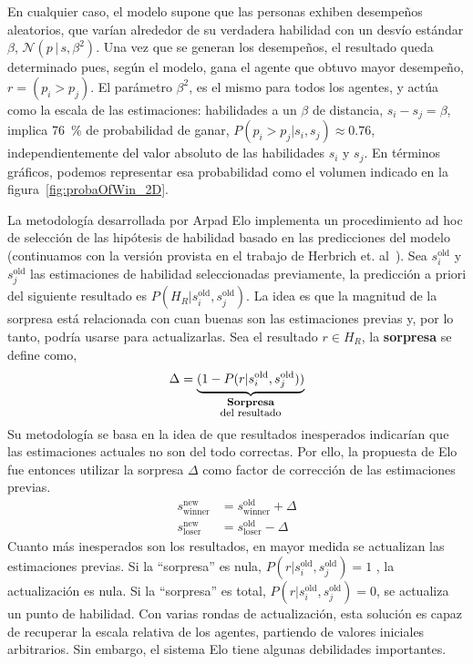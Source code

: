 \documentclass[a4paper,11pt]{book}
\newcommand{\N}{\mathcal{N}}
\newcommand\hfrac[2]{\genfrac{}{}{0pt}{}{#1}{#2}} %
\theoremstyle{definition}
\begin{document}
%
En cualquier caso, el modelo supone que las personas exhiben desempe\~nos aleatorios, que var\'ian alrededor de su verdadera habilidad con un desv\'io est\'andar $\beta$, $\N(p\,|\,s,\beta^2)$.
%
Una vez que se generan los desempe\~nos, el resultado queda determinado pues, seg\'un el modelo, gana el agente que obtuvo mayor desempe\~no, $r = (p_i > p_j)$.
%
El par\'ametro $\beta^2$, es el mismo para todos los agentes, y act\'ua como la escala de las estimaciones: habilidades a un $\beta$ de distancia, $s_i-s_j=\beta$, implica \SI{76}{\percent} de probabilidad de ganar, $P(p_i > p_j|s_i,s_j)\approx0.76$, independientemente del valor absoluto de las habilidades $s_i$ y $s_j$.
%
En t\'erminos gr\'aficos, podemos representar esa probabilidad como el volumen indicado en la figura~\ref{fig:probaOfWin_2D}.

La metodolog\'ia desarrollada por Arpad Elo implementa un procedimiento ad hoc de selecci\'on de las hip\'otesis de habilidad basado en las predicciones del modelo (continuamos con la versi\'on provista en el trabajo de Herbrich et. al~\cite{Herbrich2007}).
%
Sea $s_i^{\text{old}}$ y $s_j^{\text{old}}$ las estimaciones de habilidad seleccionadas previamente, la predicci\'on a priori del siguiente resultado es $P(H_R|s_i^{\text{old}},s_j^{\text{old}})$.
%
La idea es que la magnitud de la sorpresa est\'a relacionada con cuan buenas son las estimaciones previas y, por lo tanto, podr\'ia usarse para actualizarlas.
%
Sea el resultado $r \in H_R$, la \textbf{sorpresa} se define como,
%
\begin{equation*}
 \Delta = \underbrace{(1 - P(r|s_i^{\text{old}},s_j^{\text{old}}))}_{\hfrac{\textbf{\footnotesize Sorpresa}}{\text{\footnotesize del resultado}}}
\end{equation*}
%
Su metodolog\'ia se basa en la idea de que resultados inesperados indicar\'ian que las estimaciones actuales no son del todo correctas.
%
Por ello, la propuesta de Elo fue entonces utilizar la sorpresa $\Delta$ como factor de correcci\'on de las estimaciones previas.
%
\begin{equation}\label{eq:elo_update}
\begin{split}
s_{\text{winner}}^{\text{new}} &= s_{\text{winner}}^{\text{old}} + \Delta \\
s_{\text{loser}}^{\text{new}} &= s_{\text{loser}}^{\text{old}} - \Delta
\end{split}
\end{equation}
%
Cuanto m\'as inesperados son los resultados, en mayor medida se actualizan las estimaciones previas.
%
Si la ``sorpresa'' es nula, $P(r|s_i^{\text{old}},s_j^{\text{old}})=1$ , la actualizaci\'on es nula.
%
Si la ``sorpresa'' es total, $P(r|s_i^{\text{old}},s_j^{\text{old}})=0$, se actualiza un punto de habilidad.
%
Con varias rondas de actualizaci\'on, esta soluci\'on es capaz de recuperar la escala relativa de los agentes, partiendo de valores iniciales arbitrarios.
%
Sin embargo, el sistema Elo tiene algunas debilidades importantes.
\end{document}
